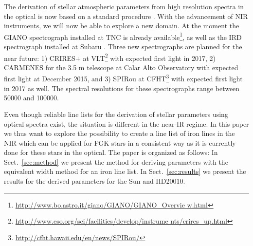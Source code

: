 \documentclass{aa}
\begin{document}
The derivation of stellar atmospheric parameters from high resolution spectra in
the optical is now based on a standard procedure \citep[see e.g.][]{Valenti2005,Sousa2008a}.
With the advancement of NIR instruments, we will now be able to explore a new
domain. At the moment the GIANO spectrograph installed at TNC is already
available\footnote{\url{http://www.bo.astro.it/giano/GIANO/GIANO_Overvie
w.html}}, as well as the IRD spectrograph installed
at Subaru \citep{IRD}. Three new spectrographs
are planned for the near future: 1) CRIRES+ at
VLT\footnote{\url{http://www.eso.org/sci/facilities/develop/instrume
nts/crires_up.html}} with expected first light in 2017, 2) CARMENES for the 3.5
m telescope at Calar Alto Observatory \citep{CARMENES} with expected first light
at December 2015, and 3) SPIRou at CFHT\footnote{\url{http://cfht.hawaii.edu/en/news/SPIRou/}} with expected first
light in 2017 as well. The spectral resolutions for these spectrographs range
between 50000 and 100000.

Even though reliable line lists for the derivation of stellar
parameters using optical spectra exist, the situation is different
in the near-IR regime. In this paper we thus want to explore the
possibility to create a line list of iron lines in the NIR which
can be applied for FGK stars in a consistent way as it is currently
done for these stars in the optical. The paper is organized as
follows: In Sect.~\ref{sec:method} we present the method for deriving
parameters with the equivalent width method for an iron line list.
In Sect.~\ref{sec:results} we present the results for the derived
parameters for the Sun and HD20010.
\end{document}
